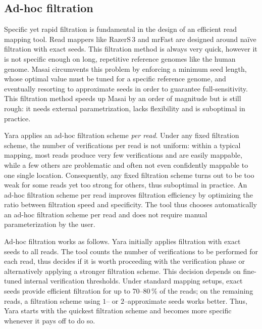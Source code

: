 \subsection{Ad-hoc filtration}

Specific yet rapid filtration is fundamental in the design of an efficient read mapping tool.
Read mappers like RazerS\,3 \citep{RazerS3} and mrFast \citep{Ahmadi2011} are designed around na\"ive filtration with exact seeds.
This filtration method is always very quick, however it is not specific enough on long, repetitive reference genomes like the human genome.
Masai \citep{Siragusa2013} circumvents this problem by enforcing a minimum seed length,
whose optimal value must be tuned for a specific reference genome, and eventually resorting to approximate seeds in order to guarantee full-sensitivity.
This filtration method speeds up Masai by an order of magnitude but is still rough:
it needs external parametrization, lacks flexibility and is suboptimal in practice.

Yara applies an ad-hoc filtration scheme \emph{per read}.
Under any fixed filtration scheme, the number of verifications per read is not uniform: within a typical mapping, most reads produce very few verifications and are easily mappable, while a few others are problematic and often not even confidently mappable to one single location.
Consequently, any fixed filtration scheme turns out to be too weak for some reads yet too strong for others, thus suboptimal in practice.
An ad-hoc filtration scheme per read improves filtration efficiency by optimizing the ratio between filtration speed and specificity.
The tool thus chooses automatically an ad-hoc filtration scheme per read and does not require manual parameterization by the user.

Ad-hoc filtration works as follows.
Yara initially applies filtration with exact seeds to all reads.
The tool counts the number of verifications to be performed for each read, thus decides if it is worth proceeding with the verification phase or alternatively applying a stronger filtration scheme.
This decision depends on fine-tuned internal verification thresholds.
Under standard mapping setups, exact seeds provide efficient filtration for up to 70--80\,\% of the reads; on the remaining reads, a filtration scheme using $1$-- or $2$--approximate seeds works better.
Thus, Yara starts with the quickest filtration scheme and becomes more specific whenever it pays off to do so.


